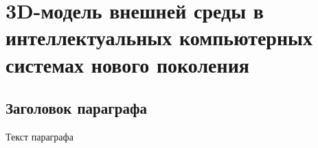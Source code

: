 \chapter{3D-модель внешней среды в интеллектуальных компьютерных системах нового поколения}
\label{chapter_3d_models}


\section{Заголовок параграфа}
Текст параграфа

%
